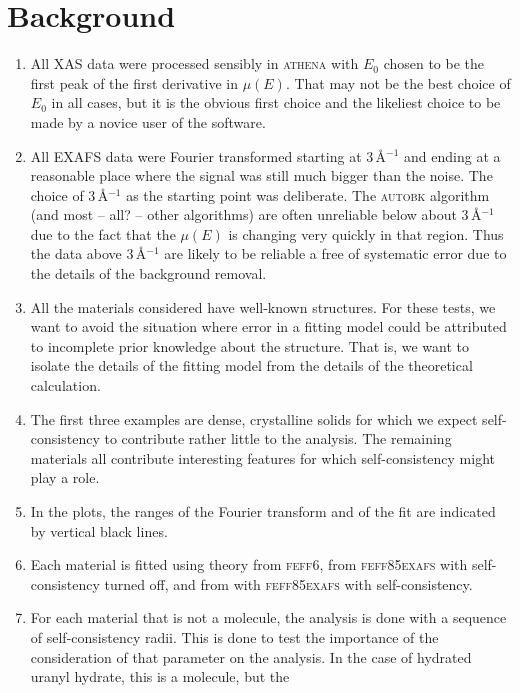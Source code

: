 \documentclass{article}
\let\stdsection\section
\renewcommand\section{\newpage\stdsection}
\begin{document}
\appendix


\section{Background}

\begin{enumerate}
\item All XAS data were processed sensibly in \textsc{athena} with
  $E_0$ chosen to be the first peak of the first derivative in
  $\mu(E)$.  That may not be the best choice of $E_0$ in all cases,
  but it is the obvious first choice and the likeliest choice to be
  made by a novice user of the software.
\item All EXAFS data were Fourier transformed starting at
  3\,\AA$^{-1}$ and ending at a reasonable place where the signal was
  still much bigger than the noise.  The choice of 3\,\AA$^{-1}$ as
  the starting point was deliberate.  The \textsc{autobk} algorithm
  (and most -- all? -- other algorithms) are often unreliable below
  about 3\,\AA$^{-1}$ due to the fact that the $\mu(E)$ is changing
  very quickly in that region.  Thus the data above 3\,\AA$^{-1}$ are
  likely to be reliable a free of systematic error due to the details
  of the background removal.
\item All the materials considered have well-known structures.  For
  these tests, we want to avoid the situation where error in a fitting
  model could be attributed to incomplete prior knowledge about the
  structure.  That is, we want to isolate the details of the fitting
  model from the details of the theoretical calculation.
\item The first three examples are dense, crystalline solids for which
  we expect self-consistency to contribute rather little to the
  analysis.  The remaining materials all contribute interesting
  features for which self-consistency might play a role.
\item In the plots, the ranges of the Fourier transform and of the fit
  are indicated by vertical black lines.
\item Each material is fitted using theory from \textsc{feff}6, from
  \textsc{feff85exafs} with self-consistency turned off, and from
  with \textsc{feff85exafs} with self-consistency.
\item For each material that is not a molecule, the analysis is done
  with a sequence of self-consistency radii.  This is done to test the
  importance of the consideration of that parameter on the analysis.
  In the case of hydrated uranyl hydrate, this is a molecule, but the

\end{enumerate}
\end{document}
